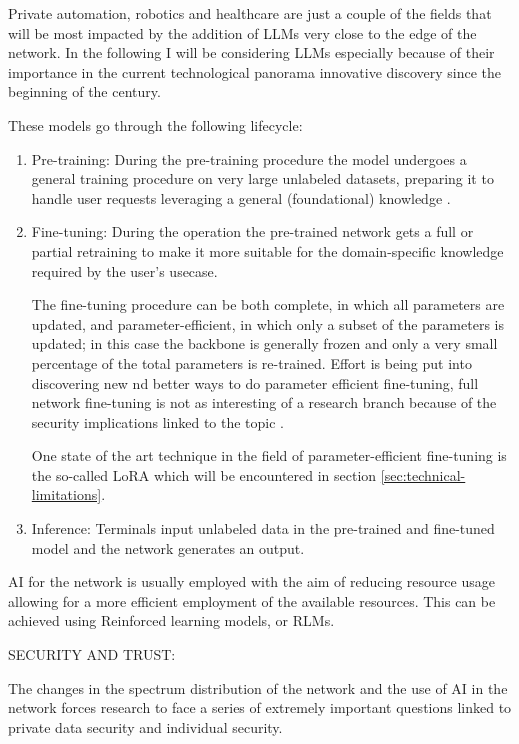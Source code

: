 Private automation, robotics and healthcare are just a couple of the fields that will be most
impacted by the addition of LLMs very close to the edge of the network. In the following I will be
considering LLMs especially because of their importance in the current technological panorama
innovative discovery since the beginning of the century.

\bigskip

These models go through the following lifecycle:
\begin{enumerate}
	\item Pre-training: During the pre-training procedure the model undergoes a general training
	      procedure on very large unlabeled datasets, preparing it to handle user requests
	      leveraging a general (foundational) knowledge \cite{gaisnet}.
	\item Fine-tuning: During the operation the pre-trained network gets a full or partial
	      retraining to make it more suitable for the domain-specific knowledge required by
	      the user's usecase.

	      The fine-tuning procedure can be both complete, in which all parameters are updated,
	      and parameter-efficient, in which only a subset of the parameters is updated; in this case the
	      backbone is generally frozen and only a very small percentage of the total
	      parameters is re-trained. Effort is being put into discovering new nd better ways to
	      do parameter efficient fine-tuning, full network fine-tuning is not as interesting of a research branch because of the security implications linked to the topic \cite{gaisnet}.

	      One state of the art technique in the field of parameter-efficient fine-tuning is the
	      so-called LoRA which will be encountered in section \ref{sec:technical-limitations}.
	\item Inference: Terminals input unlabeled data in the pre-trained and fine-tuned model and
	      the network generates an output.
\end{enumerate}

AI for the network is usually employed with the aim of reducing resource usage allowing for a
more efficient employment of the available resources. This can be achieved using Reinforced learning
models, or RLMs.

\bigskip
\noindent
SECURITY AND TRUST:
\label{ssec:security-trust}

The changes in the spectrum distribution of the network and the use of AI in the network forces
research to face a series of extremely important questions linked to private data security and
individual security.

